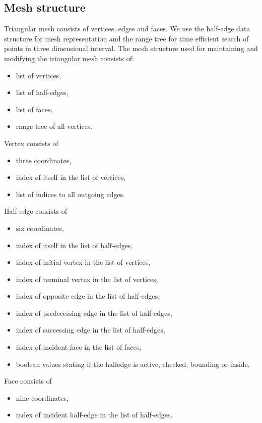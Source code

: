 \subsection{Mesh structure}
Triangular mesh consists of vertices, edges and faces. We use the half-edge 
data structure for mesh representation and the range tree for time efficient
search of points in three dimensional interval.
The mesh structure used for maintaining and modifying the triangular mesh
consists of:
\begin{itemize}
    \setlength\itemsep{-2mm}
    \item list of vertices,
    \item list of half-edges,
    \item list of faces,
    \item range tree of all vertices.
\end{itemize}
Vertex consists of 
\begin{itemize}
    \setlength\itemsep{-2mm}
    \item three coordinates,
    \item index of itself in the list of vertices,
    \item list of indices to all outgoing edges.
\end{itemize}
Half-edge consists of 
\begin{itemize}
    \setlength\itemsep{-2mm}
    \item six coordinates,
    \item index of itself in the list of half-edges,
    \item index of initial vertex in the list of vertices, 
    \item index of terminal vertex in the list of vertices,
    \item index of opposite edge in the list of half-edges,
    \item index of predecessing edge in the list of half-edges,
    \item index of successing edge in the list of half-edges,
    \item index of incident face in the list of faces,
    \item boolean values stating if the halfedge is active, checked, 
    bounding or inside.
\end{itemize}
Face consists of
\begin{itemize}
    \setlength\itemsep{-2mm}
    \item nine coordinates,
    \item index of incident half-edge in the list of half-edges.
\end{itemize}

